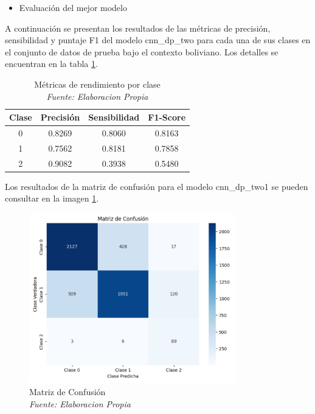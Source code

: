 \begin{itemize}
\item Evaluación del mejor modelo
\end{itemize}

A continuación se presentan los resultados de las métricas de precisión, sensibilidad y puntaje F1 del modelo cnn\_dp\_two para cada una de sus clases en el conjunto de datos de prueba bajo el contexto boliviano. Los detalles se encuentran en la tabla \ref{tbl:metrics}.

\begin{table}[!ht]
	\centering
	\begin{tabular}{|c|c|c|c|}
		\hline
		\textbf{Clase} & \textbf{Precisión} & \textbf{Sensibilidad} & \textbf{F1-Score} \\ \hline
		0 & 0.8269 & 0.8060 & 0.8163 \\ \hline
		1 & 0.7562 & 0.8181 & 0.7858 \\ \hline
		2 & 0.9082 & 0.3938 & 0.5480 \\ \hline
	\end{tabular}
	\caption{Métricas de rendimiento por clase
		\\\textit{Fuente: Elaboracion Propia}}
	\label{tbl:metrics}
\end{table}


Los resultados de la matriz de confusión para el modelo cnn\_dp\_two1 se pueden consultar en la imagen \ref{fig:matriz}.


\begin{figure}[!h]
	\includegraphics[width=0.8\textwidth]{capitulo5/figuras/matriz_confusion.PNG}
	\caption{Matriz de Confusión
		\\\textit{Fuente: Elaboracion Propia}}
	\label{fig:matriz}
\end{figure}

